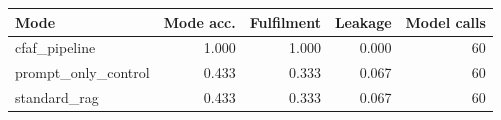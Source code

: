 \begin{tabular}{lrrrr}
Mode & Mode acc. & Fulfilment & Leakage & Model calls \\
\hline
cfaf_pipeline & 1.000 & 1.000 & 0.000 & 60 \\
prompt_only_control & 0.433 & 0.333 & 0.067 & 60 \\
standard_rag & 0.433 & 0.333 & 0.067 & 60 \\
\end{tabular}
